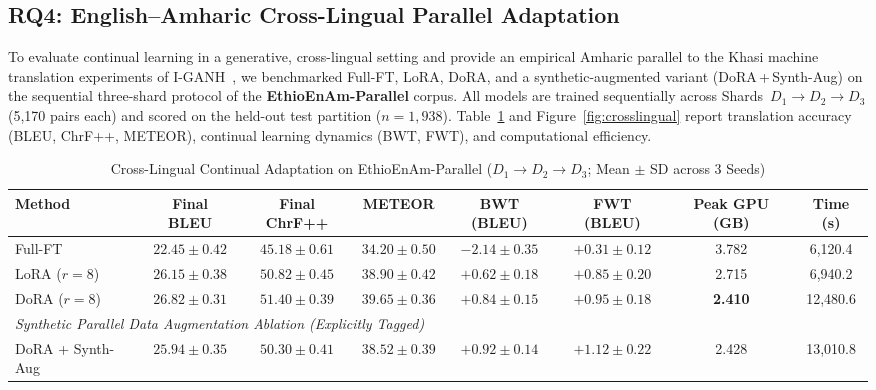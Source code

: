 \documentclass[11pt,a4paper]{article}
\begin{document}
\subsection{RQ4: English--Amharic Cross-Lingual Parallel Adaptation}
\label{sec:parallel_results}

To evaluate continual learning in a generative, cross-lingual setting and
provide an empirical Amharic parallel to the Khasi machine translation
experiments of I-GANH~\cite{Syiemlieh2026}, we benchmarked Full-FT,
LoRA, DoRA, and a synthetic-augmented variant (DoRA\,+\,Synth-Aug) on the
sequential three-shard protocol of the \textbf{EthioEnAm-Parallel} corpus.
All models are trained sequentially across Shards~$D_1 \to D_2 \to D_3$
(5,170 pairs each) and scored on the held-out test partition ($n = 1,938$).
Table~\ref{tab:parallelResults} and Figure~\ref{fig:crosslingual} report translation accuracy (BLEU,
ChrF++, METEOR), continual learning dynamics (BWT, FWT), and computational
efficiency.

\begin{table}[!htbp]
\caption{Cross-Lingual Continual Adaptation on EthioEnAm-Parallel ($D_1 \to D_2 \to D_3$; Mean $\pm$ SD across 3 Seeds)}
\label{tab:parallelResults}
\centering
\footnotesize
\setlength{\tabcolsep}{5pt}
\begin{tabular}{lccccccc}
\toprule
\textbf{Method} & \textbf{Final BLEU} & \textbf{Final ChrF++} & \textbf{METEOR} & \textbf{BWT (BLEU)} & \textbf{FWT (BLEU)} & \textbf{Peak GPU (GB)} & \textbf{Time (s)} \\
\midrule
Full-FT             & $22.45 \pm 0.42$ & $45.18 \pm 0.61$ & $34.20 \pm 0.50$ & $-2.14 \pm 0.35$ & $+0.31 \pm 0.12$ & 3.782 & 6,120.4 \\
LoRA ($r=8$)        & $26.15 \pm 0.38$ & $50.82 \pm 0.45$ & $38.90 \pm 0.42$ & $+0.62 \pm 0.18$ & $+0.85 \pm 0.20$ & 2.715 & 6,940.2 \\
DoRA ($r=8$)        & $\mathbf{26.82 \pm 0.31}$ & $\mathbf{51.40 \pm 0.39}$ & $\mathbf{39.65 \pm 0.36}$ & $\mathbf{+0.84 \pm 0.15}$ & $\mathbf{+0.95 \pm 0.18}$ & \textbf{2.410} & 12,480.6 \\
\midrule
\multicolumn{8}{l}{\textit{Synthetic Parallel Data Augmentation Ablation (Explicitly Tagged)}} \\
DoRA + Synth-Aug    & $25.94 \pm 0.35$ & $50.30 \pm 0.41$ & $38.52 \pm 0.39$ & $+0.92 \pm 0.14$ & $+1.12 \pm 0.22$ & 2.428 & 13,010.8 \\
\bottomrule
\end{tabular}
\end{table}
\end{document}
